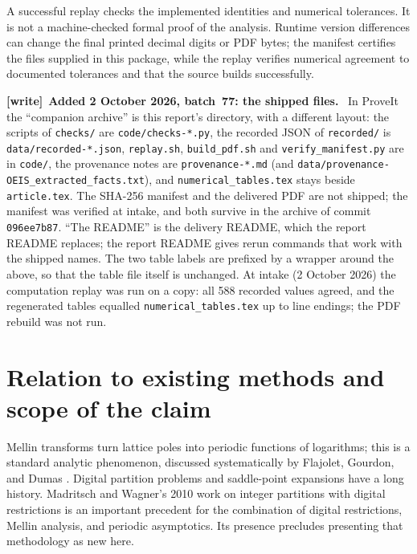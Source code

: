 \documentclass[11pt,letterpaper]{article}
\numberwithin{equation}{section}
\theoremstyle{remark}\newtheorem{remark}[theorem]{Remark}
\newenvironment{writenote}[1][]{\par\smallskip\begingroup\small
 \noindent\textbf{[write]}\if\relax\detokenize{#1}\relax\else~\textbf{#1.}\fi\ }%
 {\par\endgroup\smallskip}
\begin{document}
A successful replay checks the implemented identities and numerical tolerances. It is not a machine-checked formal proof of the analysis. Runtime version differences can change the final printed decimal digits or PDF bytes; the manifest certifies the files supplied in this package, while the replay verifies numerical agreement to documented tolerances and that the source builds successfully.

\begin{writenote}[Added 2 October 2026, batch~77: the shipped files]
In ProveIt the ``companion archive'' is this report's directory, with a
different layout: the scripts of \texttt{checks/} are
\texttt{code/checks-*.py}, the recorded JSON of \texttt{recorded/} is
\texttt{data/recorded-*.json}, \texttt{replay.sh}, \texttt{build\_pdf.sh}
and \texttt{verify\_manifest.py} are in \texttt{code/}, the provenance
notes are \texttt{provenance-*.md} (and
\texttt{data/provenance-OEIS\_extracted\_facts.txt}), and
\texttt{numerical\_tables.tex} stays beside \texttt{article.tex}. The
SHA-256 manifest and the delivered PDF are not shipped; the manifest was
verified at intake, and both survive in the archive of commit
\texttt{096ee7b87}. ``The README'' is the delivery README, which the report
README replaces; the report README gives rerun commands that work with the
shipped names. The two table labels are prefixed by a wrapper around the
\verb|| above, so that the table file itself is unchanged. At intake
(2 October 2026) the computation replay was run on a copy: all 588 recorded
values agreed, and the regenerated tables equalled
\texttt{numerical\_tables.tex} up to line endings; the PDF rebuild was not
run.
\end{writenote}

\section{Relation to existing methods and scope of the claim}
\label{rlp:sec:history}
Mellin transforms turn lattice poles into periodic functions of logarithms; this is a standard analytic phenomenon, discussed systematically by Flajolet, Gourdon, and Dumas \cite{mellin}. Digital partition problems and saddle-point expansions have a long history. Madritsch and Wagner's 2010 work on integer partitions with digital restrictions \cite{madritsch} is an important precedent for the combination of digital restrictions, Mellin analysis, and periodic asymptotics. Its presence precludes presenting that methodology as new here.
\end{document}
